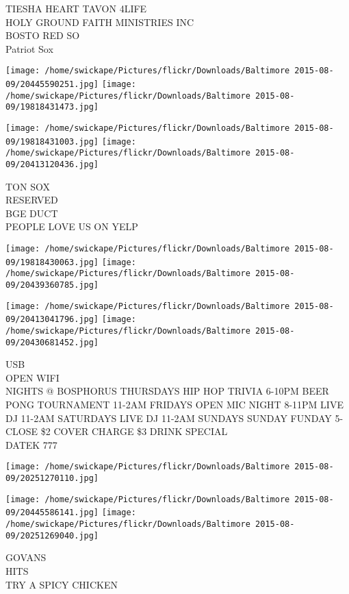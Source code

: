 \documentclass[10pt,letterpaper]{article}
\begin{document}
TIESHA HEART TAVON 4LIFE\\
HOLY GROUND FAITH MINISTRIES INC\\
BOSTO RED SO\\
Patriot Sox\\
\pagebreak

\texttt{[image: /home/swickape/Pictures/flickr/Downloads/Baltimore 2015-08-09/20445590251.jpg]}
\texttt{[image: /home/swickape/Pictures/flickr/Downloads/Baltimore 2015-08-09/19818431473.jpg]}

\texttt{[image: /home/swickape/Pictures/flickr/Downloads/Baltimore 2015-08-09/19818431003.jpg]}
\texttt{[image: /home/swickape/Pictures/flickr/Downloads/Baltimore 2015-08-09/20413120436.jpg]}

TON SOX\\
RESERVED\\
BGE DUCT\\
PEOPLE LOVE US ON YELP\\
\pagebreak

\texttt{[image: /home/swickape/Pictures/flickr/Downloads/Baltimore 2015-08-09/19818430063.jpg]}
\texttt{[image: /home/swickape/Pictures/flickr/Downloads/Baltimore 2015-08-09/20439360785.jpg]}

\texttt{[image: /home/swickape/Pictures/flickr/Downloads/Baltimore 2015-08-09/20413041796.jpg]}
\texttt{[image: /home/swickape/Pictures/flickr/Downloads/Baltimore 2015-08-09/20430681452.jpg]}

USB\\
OPEN WIFI\\
NIGHTS @ BOSPHORUS THURSDAYS HIP HOP TRIVIA 6{-}10PM BEER PONG TOURNAMENT 11{-}2AM FRIDAYS OPEN MIC NIGHT 8{-}11PM LIVE DJ 11{-}2AM SATURDAYS LIVE DJ 11{-}2AM SUNDAYS SUNDAY FUNDAY 5{-}CLOSE \$2 COVER CHARGE \$3 DRINK SPECIAL\\
DATEK 777\\
\pagebreak

\texttt{[image: /home/swickape/Pictures/flickr/Downloads/Baltimore 2015-08-09/20251270110.jpg]}

\vspace{0.25in}
\texttt{[image: /home/swickape/Pictures/flickr/Downloads/Baltimore 2015-08-09/20445586141.jpg]}
\texttt{[image: /home/swickape/Pictures/flickr/Downloads/Baltimore 2015-08-09/20251269040.jpg]}

GOVANS\\
HITS\\
TRY A SPICY CHICKEN\\
\pagebreak
\end{document}
